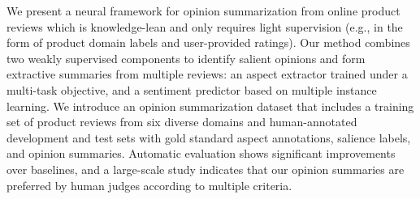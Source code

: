 We present a neural framework for opinion summarization from online product reviews which is knowledge-lean and only requires light supervision (e.g., in the form of product domain labels and user-provided ratings). Our method combines two weakly supervised components to identify salient opinions and form extractive summaries from multiple reviews: an aspect extractor trained under a multi-task objective, and a sentiment predictor based on multiple instance learning. We introduce an opinion summarization dataset that includes a training set of product reviews from six diverse domains and human-annotated development and test sets with gold standard aspect annotations, salience labels, and opinion summaries. Automatic evaluation shows significant improvements over baselines, and a large-scale study indicates that our opinion summaries are preferred by human judges according to multiple criteria.
